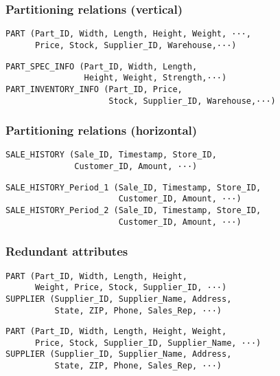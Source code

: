 \documentclass{beamer}
\begin{document}
\begin{frame}[fragile]
\frametitle{Partitioning relations (vertical)}


\begin{verbatim}
PART (Part_ID, Width, Length, Height, Weight, ···,
      Price, Stock, Supplier_ID, Warehouse,···)
\end{verbatim}

\vspace{\baselineskip}

\begin{verbatim}
PART_SPEC_INFO (Part_ID, Width, Length,
                Height, Weight, Strength,···)
PART_INVENTORY_INFO (Part_ID, Price,
                     Stock, Supplier_ID, Warehouse,···)
\end{verbatim}

\end{frame}


\begin{frame}[fragile]
\frametitle{Partitioning relations (horizontal)}


\begin{verbatim}
SALE_HISTORY (Sale_ID, Timestamp, Store_ID,
              Customer_ID, Amount, ···)
\end{verbatim}

\vspace{\baselineskip}

\begin{verbatim}
SALE_HISTORY_Period_1 (Sale_ID, Timestamp, Store_ID,
                       Customer_ID, Amount, ···)
SALE_HISTORY_Period_2 (Sale_ID, Timestamp, Store_ID,
                       Customer_ID, Amount, ···)
\end{verbatim}

\end{frame}

\begin{frame}[fragile]
\frametitle{Redundant attributes}

\begin{verbatim}
PART (Part_ID, Width, Length, Height,
      Weight, Price, Stock, Supplier_ID, ···)
SUPPLIER (Supplier_ID, Supplier_Name, Address,
          State, ZIP, Phone, Sales_Rep, ···)
\end{verbatim}

\vspace{\baselineskip}

\begin{verbatim}
PART (Part_ID, Width, Length, Height, Weight,
      Price, Stock, Supplier_ID, Supplier_Name, ···)
SUPPLIER (Supplier_ID, Supplier_Name, Address,
          State, ZIP, Phone, Sales_Rep, ···)
\end{verbatim}

\end{frame}
\end{document}
